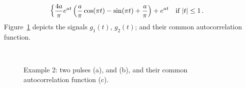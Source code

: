 \begin{description}
\begin{equation}
\begin{dcases}
      \frac{4a}{\pi}e^{at}
      \left(
        \frac{a}{\pi}\cos(\pi t) - \sin(\pi t) + \frac{a}{\pi}
      \right) + e^{at} & \text{if $|t| \leq 1$} \,. 
    \end{dcases}
  \end{equation}
  Figure~\ref{fig:math-example2} depicts the signals $g_{1}(t)$,
  $g_{2}(t)$; and their common autocorrelation function.
   \begin{figure}[H]
     \centering
     \qquad{}
    \\
    \caption[Two pulses with the same autocorrelation]{Example 2:  two pulses (a), and (b), and their common
      autocorrelation function (c).}
    \label{fig:math-example2}
  \end{figure}
\end{description}

